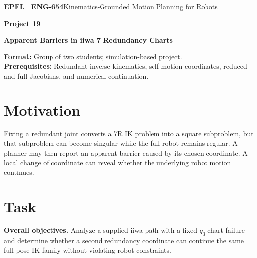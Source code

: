 \documentclass[11pt,a4paper]{article}
\begin{document}
{\small\textbf{EPFL \textbar\ ENG-654}\hfill Kinematics-Grounded Motion Planning for Robots}
\vspace{5mm}

{\color{epflred}\Large\bfseries Project 19}

{\LARGE\bfseries Apparent Barriers in iiwa 7 Redundancy Charts\par}

\textbf{Format:} Group of two students; simulation-based project.\\
\textbf{Prerequisites:} Redundant inverse kinematics, self-motion coordinates, reduced and full Jacobians, and numerical continuation.

\section*{Motivation}
Fixing a redundant joint converts a 7R IK problem into a square
subproblem, but that subproblem can become singular while the full robot
remains regular. A planner may then report an apparent barrier caused by
its chosen coordinate. A local change of coordinate can reveal whether
the underlying robot motion continues.

\section*{Task}
\textbf{Overall objectives.} Analyze a supplied iiwa path with a fixed-$q_3$ chart failure and
determine whether a second redundancy coordinate can continue the same
full-pose IK family without violating robot constraints.
\end{document}
